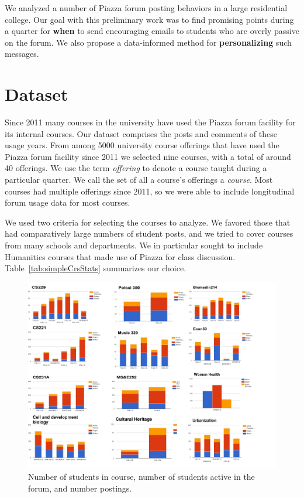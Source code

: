 We analyzed a number of Piazza forum posting behaviors in a large
residential college. Our goal with this preliminary work was to find
promising points during a quarter for {\bf when} to send encouraging
emails to students who are overly passive on the forum. We also
propose a data-informed method for {\bf personalizing} such messages.

\section{Dataset}

Since 2011 many courses in the university have used the Piazza forum
facility for its internal courses. Our dataset comprises the posts and
comments of these usage years. From among 5000 university course
offerings that have used the Piazza forum facility since 2011 we
selected nine courses, with a total of around 40 offerings. We use the
term {\em offering} to denote a course taught during a particular
quarter. We call the set of all a course's offerings a {\em course}.
Most courses had multiple offerings since 2011, so we were able to
include longitudinal forum usage data for most courses.

We used two criteria for selecting the courses to analyze. We favored
those that had comparatively large numbers of student posts, and we
tried to cover courses from many schools and departments. We in
particular sought to include Humanities courses that made use of
 Piazza for class discussion. Table~\ref{tab:simpleCrsStats} summarizes
 our choice.
 
 \begin{figure}[htp]
       \centering
       \includegraphics[width=1.2\textwidth]{Figs/nodes2.pdf}
       \caption{\textnormal{Number of students in course, number of
           students active in the forum, and number postings.}}
       \label{fig:graphExpl}
\end{figure}
 

